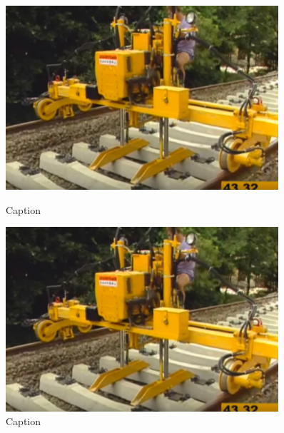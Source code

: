\renewcommand\w{0.3\linewidth}
\renewcommand\fw{0.9\textwidth}

\begin{figure}[h]
  \centering
  \begin{minipage}[b]{\w}
    \centering
    \includegraphics[width=\fw]{img/13-app/01.png}
    \caption{Caption}
    \vspace{4ex}
  \end{minipage} %
  \begin{minipage}[b]{\w}
    \centering
    \includegraphics[width=\fw]{img/13-app/02.png}
    \caption{Caption}
    \vspace{4ex}
  \end{minipage} %
  \begin{minipage}[b]{\w}
    \centering

\end{minipage}
\end{figure}
